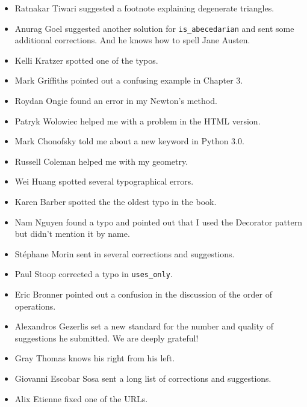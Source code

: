 \documentclass[10pt]{book}
\begin{document}
\begin{itemize}
\item Ratnakar Tiwari suggested a footnote explaining degenerate
triangles.

\item Anurag Goel suggested another solution for \verb"is_abecedarian"
and sent some additional corrections.  And he knows how to
spell Jane Austen.

\item Kelli Kratzer spotted one of the typos.

\item Mark Griffiths pointed out a confusing example in Chapter 3.

\item Roydan Ongie found an error in my Newton's method.

\item Patryk Wolowiec helped me with a problem in the HTML version.

\item Mark Chonofsky told me about a new keyword in Python 3.0.

\item Russell Coleman helped me with my geometry.

\item Wei Huang spotted several typographical errors.

\item Karen Barber spotted the the oldest typo in the book.

\item Nam Nguyen found a typo and pointed out that I used the Decorator
pattern but didn't mention it by name.

\item St\'{e}phane Morin sent in several corrections and suggestions.

\item Paul Stoop corrected a typo in \verb+uses_only+.

\item Eric Bronner pointed out a confusion in the discussion of the
order of operations.

\item Alexandros Gezerlis set a new standard for the number and
quality of suggestions he submitted.  We are deeply grateful!

\item Gray Thomas knows his right from his left.

\item Giovanni Escobar Sosa sent a long list of corrections and
suggestions.

\item Alix Etienne fixed one of the URLs.


\end{itemize}
\end{document}
